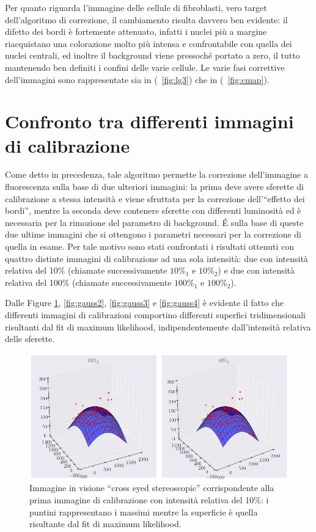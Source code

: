 Per quanto riguarda l'immagine delle cellule di fibroblasti, vero target dell'algoritmo di correzione, il cambiamento risulta davvero ben evidente: il difetto dei bordi è fortemente attenuato, infatti i nuclei più a margine riacquistano una colorazione molto più intensa e confrontabile con quella dei nuclei centrali, ed inoltre il background viene pressoché portato a zero, il tutto mantenendo ben definiti i confini delle varie cellule.
Le varie fasi correttive dell'immagini sono rappresentate sia in (\figurename~\ref{fig:lg3}) che in (\figurename~\ref{fig:cmap}).


\section{Confronto tra differenti immagini di calibrazione}

Come detto in precedenza, tale algoritmo permette la correzione dell'immagine a fluorescenza sulla base di due ulteriori immagini: la prima deve avere sferette di calibrazione a stessa intensità e viene sfruttata per la correzione dell'``effetto dei bordi'', mentre la seconda deve contenere sferette con differenti luminosità ed è necessaria per la rimozione del parametro di background. 
\'E sulla base di queste due ultime immagini che si ottengono i parametri necessari per la correzione di quella in esame.
Per tale motivo sono stati confrontati i risultati ottenuti con quattro distinte immagini di calibrazione ad una sola intensità: due con intensità relativa del 10\% (chiamate successivamente $10\%_1$ e $10\%_2$) e due con intensità relativa del 100\% (chiamate successivamente $100\%_1$ e $100\%_2$).

Dalle Figure \ref{fig:gauss1}, \ref{fig:gauss2}, \ref{fig:gauss3} e \ref{fig:gauss4} è evidente il fatto che differenti immagini di calibrazioni comportino differenti superfici tridimensionali risultanti dal fit di maximum likelihood, indipendentemente dall'intensità relativa delle sferette.

\begin{figure}
 \centering
 \includegraphics[scale=.45]{img/CAP4gauss1.png}
 \caption{\small{Immagine in visione ``cross eyed stereoscopic'' corrispondente alla prima immagine di calibrazione con intensità relativa del 10\%: i puntini rappresentano i massimi mentre la superficie è quella risultante dal fit di maximum likelihood.}}
 \label{fig:gauss1}
\end{figure}

